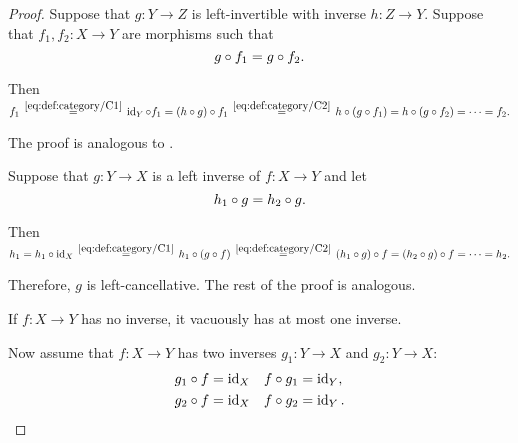 \begin{proof}
   Suppose that \( g: Y \to Z \) is left-invertible with inverse \( h: Z \to Y \). Suppose that \( f_1, f_2: X \to Y \) are morphisms such that
  \begin{equation*}
    g \bincirc f_1 = g \bincirc f_2.
  \end{equation*}

  Then
  \begin{equation*}
    f_1
    \reloset {\eqref{eq:def:category/C1}} =
    \id_Y \bincirc f_1
    =
    (h \bincirc g) \bincirc f_1
    \reloset {\eqref{eq:def:category/C2}} =
    h \bincirc (g \bincirc f_1)
    =
    h \bincirc (g \bincirc f_2)
    =
    \cdots
    =
    f_2.
  \end{equation*}

   The proof is analogous to .

   Suppose that \( g: Y \to X \) is a left inverse of \( f: X \to Y \) and let
  \begin{equation*}
    h_1 \bincirc g = h_2 \bincirc g.
  \end{equation*}

  Then
  \begin{equation*}
    h_1
    =
    h_1 \bincirc \id_X
    \reloset {\eqref{eq:def:category/C1}} =
    h_1 \bincirc (g \bincirc f)
    \reloset {\eqref{eq:def:category/C2}} =
    (h_1 \bincirc g) \bincirc f
    =
    (h_2 \bincirc g) \bincirc f
    =
    \cdots
    =
    h_2.
  \end{equation*}

  Therefore, \( g \) is left-cancellative. The rest of the proof is analogous.

   If \( f: X \to Y \) has no inverse, it vacuously has at most one inverse.

  Now assume that \( f: X \to Y \) has two inverses \( g_1: Y \to X \) and \( g_2: Y \to X \):
  \begin{align*}
    g_1 \bincirc f = \id_X &&& f \bincirc g_1 = \id_Y, \\
    g_2 \bincirc f = \id_X &&& f \bincirc g_2 = \id_Y.
  \end{align*}


\end{proof}
